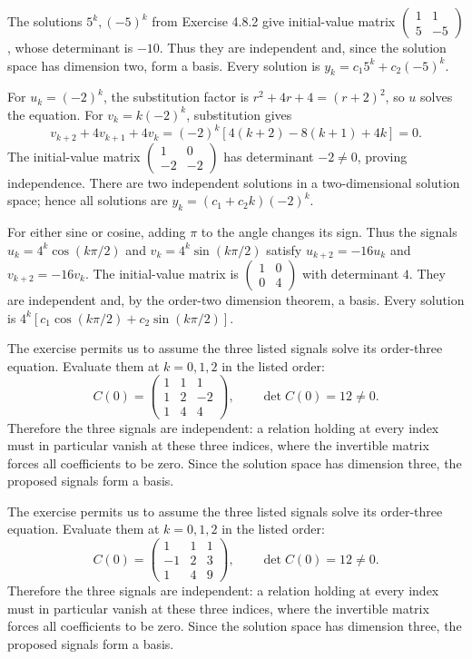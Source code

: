The solutions $5^k,(-5)^k$ from Exercise 4.8.2 give initial-value matrix
$\left(\begin{smallmatrix}1&1\\5&-5\end{smallmatrix}\right)$,
whose determinant is $-10$. Thus they are independent and, since the
solution space has dimension two, form a basis. Every solution is
$y_k=c_1 5^k+c_2(-5)^k$.

For $u_k=(-2)^k$, the substitution factor is $r^2+4r+4=(r+2)^2$, so $u$
solves the equation. For $v_k=k(-2)^k$, substitution gives
\[
 v_{k+2}+4v_{k+1}+4v_k
 =(-2)^k[4(k+2)-8(k+1)+4k]=0.
\]
The initial-value matrix $\left(\begin{smallmatrix}1&0\\-2&-2\end{smallmatrix}\right)$
has determinant $-2\ne0$, proving independence. There are two independent
solutions in a two-dimensional solution space; hence all solutions are
$y_k=(c_1+c_2k)(-2)^k$.

For either sine or cosine, adding $\pi$ to the angle changes its sign.
Thus the signals $u_k=4^k\cos(k\pi/2)$ and $v_k=4^k\sin(k\pi/2)$
satisfy $u_{k+2}=-16u_k$ and $v_{k+2}=-16v_k$.
The initial-value matrix is
$\left(\begin{smallmatrix}1&0\\0&4\end{smallmatrix}\right)$ with determinant $4$.
They are independent and, by the order-two dimension theorem, a basis.
Every solution is $4^k[c_1\cos(k\pi/2)+c_2\sin(k\pi/2)]$.

The exercise permits us to assume the three listed signals solve its order-three equation. Evaluate them at $k=0,1,2$ in the listed order:
\[ C(0)=\begin{pmatrix}1&1&1\\1&2&-2\\1&4&4\end{pmatrix},\qquad\det C(0)=12\ne0.\]
Therefore the three signals are independent: a relation holding at every index must in particular vanish at these three indices, where the invertible matrix forces all coefficients to be zero. Since the solution space has dimension three, the proposed signals form a basis.

The exercise permits us to assume the three listed signals solve its order-three equation. Evaluate them at $k=0,1,2$ in the listed order:
\[ C(0)=\begin{pmatrix}1&1&1\\-1&2&3\\1&4&9\end{pmatrix},\qquad\det C(0)=12\ne0.\]
Therefore the three signals are independent: a relation holding at every index must in particular vanish at these three indices, where the invertible matrix forces all coefficients to be zero. Since the solution space has dimension three, the proposed signals form a basis.

